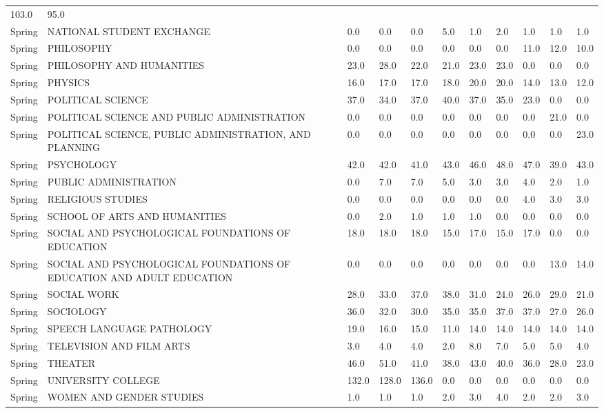 \documentclass{article}
\begin{document}
\begin{longtable}[]{|l|p{4cm}|p{0.8cm}|p{0.8cm}|p{0.8cm}|p{0.8cm}|p{0.8cm}|p{0.8cm}|p{0.8cm}|p{0.8cm}|p{0.8cm}|}
103.0 & 95.0 \\
Spring & NATIONAL STUDENT EXCHANGE & 0.0 & 0.0 & 0.0 & 5.0 & 1.0 & 2.0 &
1.0 & 1.0 & 1.0 \\
Spring & PHILOSOPHY & 0.0 & 0.0 & 0.0 & 0.0 & 0.0 & 0.0 & 11.0 & 12.0 &
10.0 \\
Spring & PHILOSOPHY AND HUMANITIES & 23.0 & 28.0 & 22.0 & 21.0 & 23.0 &
23.0 & 0.0 & 0.0 & 0.0 \\
Spring & PHYSICS & 16.0 & 17.0 & 17.0 & 18.0 & 20.0 & 20.0 & 14.0 & 13.0
& 12.0 \\
Spring & POLITICAL SCIENCE & 37.0 & 34.0 & 37.0 & 40.0 & 37.0 & 35.0 &
23.0 & 0.0 & 0.0 \\
Spring & POLITICAL SCIENCE AND PUBLIC ADMINISTRATION & 0.0 & 0.0 & 0.0 &
0.0 & 0.0 & 0.0 & 0.0 & 21.0 & 0.0 \\
Spring & POLITICAL SCIENCE, PUBLIC ADMINISTRATION, AND PLANNING & 0.0 &
0.0 & 0.0 & 0.0 & 0.0 & 0.0 & 0.0 & 0.0 & 23.0 \\
Spring & PSYCHOLOGY & 42.0 & 42.0 & 41.0 & 43.0 & 46.0 & 48.0 & 47.0 &
39.0 & 43.0 \\
Spring & PUBLIC ADMINISTRATION & 0.0 & 7.0 & 7.0 & 5.0 & 3.0 & 3.0 & 4.0
& 2.0 & 1.0 \\
Spring & RELIGIOUS STUDIES & 0.0 & 0.0 & 0.0 & 0.0 & 0.0 & 0.0 & 4.0 &
3.0 & 3.0 \\
Spring & SCHOOL OF ARTS AND HUMANITIES & 0.0 & 2.0 & 1.0 & 1.0 & 1.0 &
0.0 & 0.0 & 0.0 & 0.0 \\
Spring & SOCIAL AND PSYCHOLOGICAL FOUNDATIONS OF EDUCATION & 18.0 & 18.0
& 18.0 & 15.0 & 17.0 & 15.0 & 17.0 & 0.0 & 0.0 \\
Spring & SOCIAL AND PSYCHOLOGICAL FOUNDATIONS OF EDUCATION AND ADULT
EDUCATION & 0.0 & 0.0 & 0.0 & 0.0 & 0.0 & 0.0 & 0.0 & 13.0 & 14.0 \\
Spring & SOCIAL WORK & 28.0 & 33.0 & 37.0 & 38.0 & 31.0 & 24.0 & 26.0 &
29.0 & 21.0 \\
Spring & SOCIOLOGY & 36.0 & 32.0 & 30.0 & 35.0 & 35.0 & 37.0 & 37.0 &
27.0 & 26.0 \\
Spring & SPEECH LANGUAGE PATHOLOGY & 19.0 & 16.0 & 15.0 & 11.0 & 14.0 &
14.0 & 14.0 & 14.0 & 14.0 \\
Spring & TELEVISION AND FILM ARTS & 3.0 & 4.0 & 4.0 & 2.0 & 8.0 & 7.0 &
5.0 & 5.0 & 4.0 \\
Spring & THEATER & 46.0 & 51.0 & 41.0 & 38.0 & 43.0 & 40.0 & 36.0 & 28.0
& 23.0 \\
Spring & UNIVERSITY COLLEGE & 132.0 & 128.0 & 136.0 & 0.0 & 0.0 & 0.0 &
0.0 & 0.0 & 0.0 \\
Spring & WOMEN AND GENDER STUDIES & 1.0 & 1.0 & 1.0 & 2.0 & 3.0 & 4.0 &
2.0 & 2.0 & 3.0 \\
\end{longtable}
\end{document}
